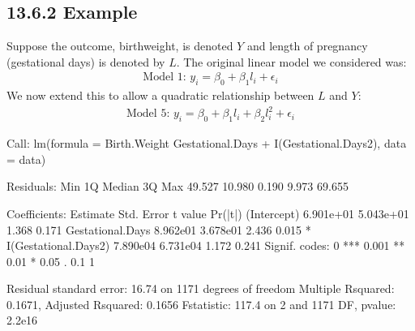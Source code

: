 \documentclass[letterpaper,10pt,english]{jupyterBook}
\begin{document}
\subsection{13.6.2 Example}
\label{\detokenize{13.f. Linear Regression II:example}}
\sphinxAtStartPar
Suppose the outcome, birthweight, is denoted \(Y\) and length of pregnancy (gestational days) is denoted by \(L\). The original linear model we considered was:
\begin{equation*}
\begin{split}
\text{Model 1: } y_i = \beta_0 + \beta_1 l_i + \epsilon_i
\end{split}
\end{equation*}
\sphinxAtStartPar
We now extend this to allow a quadratic relationship between \(L\) and \(Y\):
\begin{equation*}
\begin{split}
\text{Model 5: } y_i = \beta_0 + \beta_1 l_i + \beta_2 l^2_i + \epsilon_i
\end{split}
\end{equation*}
\begin{sphinxVerbatim}[commandchars=\\\{\}]
 

 
\end{sphinxVerbatim}

\begin{sphinxVerbatim}[commandchars=\\\{\}]
Call:
lm(formula = Birth.Weight \PYGZti{} Gestational.Days + I(Gestational.Days\PYGZca{}2), 
    data = data)

Residuals:
    Min      1Q  Median      3Q     Max 
\PYGZhy{}49.527 \PYGZhy{}10.980   0.190   9.973  69.655 

Coefficients:
                        Estimate Std. Error t value Pr(\PYGZgt{}|t|)  
(Intercept)           \PYGZhy{}6.901e+01  5.043e+01  \PYGZhy{}1.368    0.171  
Gestational.Days       8.962e\PYGZhy{}01  3.678e\PYGZhy{}01   2.436    0.015 *
I(Gestational.Days\PYGZca{}2) \PYGZhy{}7.890e\PYGZhy{}04  6.731e\PYGZhy{}04  \PYGZhy{}1.172    0.241  
\PYGZhy{}\PYGZhy{}\PYGZhy{}
Signif. codes:  0 \PYGZsq{}***\PYGZsq{} 0.001 \PYGZsq{}**\PYGZsq{} 0.01 \PYGZsq{}*\PYGZsq{} 0.05 \PYGZsq{}.\PYGZsq{} 0.1 \PYGZsq{} \PYGZsq{} 1

Residual standard error: 16.74 on 1171 degrees of freedom
Multiple R\PYGZhy{}squared:  0.1671,	Adjusted R\PYGZhy{}squared:  0.1656 
F\PYGZhy{}statistic: 117.4 on 2 and 1171 DF,  p\PYGZhy{}value: \PYGZlt{} 2.2e\PYGZhy{}16
\end{sphinxVerbatim}
\end{document}
